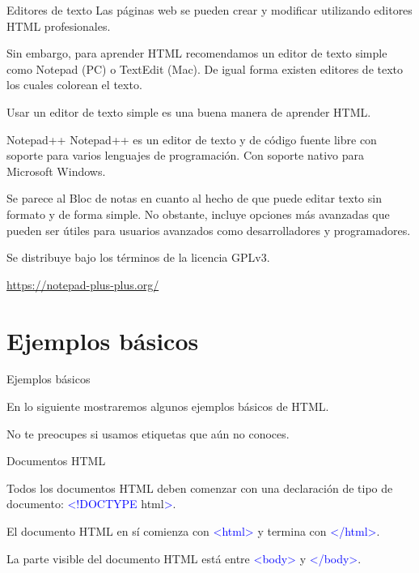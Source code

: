 \begin{frame}[c]{Editores de texto}
  Las páginas web se pueden crear y modificar utilizando editores HTML profesionales.

  \vspace{\baselineskip}
  Sin embargo, para aprender HTML recomendamos un editor de texto simple
  como Notepad (PC) o TextEdit (Mac). De igual forma existen editores de
  texto los cuales colorean el texto.

  \vspace{\baselineskip}
  Usar un editor de texto simple es una buena manera de aprender HTML.
\end{frame}


\begin{frame}[c]{Notepad++}
  Notepad++ es un editor de texto y de código fuente libre con soporte
  para varios lenguajes de programación. Con soporte nativo para
  Microsoft Windows.

  \vspace{\baselineskip}
  Se parece al Bloc de notas en cuanto al hecho de que puede editar texto
  sin formato y de forma simple. No obstante, incluye opciones más
  avanzadas que pueden ser útiles para usuarios avanzados como
  desarrolladores y programadores.

  \vspace{\baselineskip}
  Se distribuye bajo los términos de la licencia GPLv3.

  \vspace{\baselineskip}
  \href{https://notepad-plus-plus.org/}{https://notepad-plus-plus.org/}
\end{frame}

\section{Ejemplos básicos}

\begin{frame}[c]{Ejemplos básicos}

  \vspace{\baselineskip}
  En lo siguiente mostraremos algunos ejemplos básicos de HTML.

  \vspace{\baselineskip}
  No te preocupes si usamos etiquetas que aún no conoces.
\end{frame}

\begin{frame}[c]{Documentos HTML}

  Todos los documentos HTML deben comenzar con una declaración de
  tipo de documento: \textcolor{blue}{<!DOCTYPE} html\textcolor{blue}{>}.

  \vspace{\baselineskip}
  El documento HTML en sí comienza con \textcolor{blue}{<html>} y
  termina con \textcolor{blue}{</html>}.

  \vspace{\baselineskip}
  La parte visible del documento HTML está entre \textcolor{blue}{<body>}
  y \textcolor{blue}{</body>}.
\end{frame}

